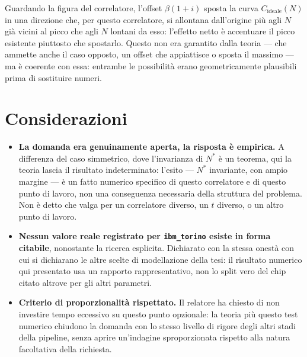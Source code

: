 \documentclass[11pt,a4paper]{article}
\begin{document}
Guardando la figura del correlatore, l'offset $\beta(1+i)$ sposta la curva
$C_\text{ideale}(N)$ in una direzione che, per questo correlatore, si
allontana dall'origine più agli $N$ già vicini al picco che agli $N$ lontani
da esso: l'effetto netto è accentuare il picco esistente piuttosto che
spostarlo. Questo non era garantito dalla teoria --- che ammette anche il caso
opposto, un offset che appiattisce o sposta il massimo --- ma è coerente con
essa: entrambe le possibilità erano geometricamente plausibili prima di
sostituire numeri.

\section{Considerazioni}

\begin{itemize}[leftmargin=1.5em,itemsep=3pt]
\item \textbf{La domanda era genuinamente aperta, la risposta è empirica.} A
differenza del caso simmetrico, dove l'invarianza di $N^*$ è un teorema, qui
la teoria lascia il risultato indeterminato: l'esito --- $N^*$ invariante, con
ampio margine --- è un fatto numerico specifico di questo correlatore e di
questo punto di lavoro, non una conseguenza necessaria della struttura del
problema. Non è detto che valga per un correlatore diverso, un $t$ diverso, o
un altro punto di lavoro.
\item \textbf{Nessun valore reale registrato per \texttt{ibm\_torino} esiste
in forma citabile}, nonostante la ricerca esplicita. Dichiarato con la stessa
onestà con cui si dichiarano le altre scelte di modellazione della tesi: il
risultato numerico qui presentato usa un rapporto rappresentativo, non lo
split vero del chip citato altrove per gli altri parametri.
\item \textbf{Criterio di proporzionalità rispettato.} Il relatore ha chiesto
di non investire tempo eccessivo su questo punto opzionale: la teoria più
questo test numerico chiudono la domanda con lo stesso livello di rigore degli
altri stadi della pipeline, senza aprire un'indagine sproporzionata rispetto
alla natura facoltativa della richiesta.
\end{itemize}

\end{document}
